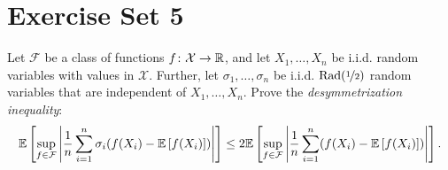 \section{Exercise Set 5}

\begin{exercise}
\end{exercise}


\begin{exercise}
Let $\mathcal{F}$ be a class of functions $f \colon \mathcal{X} \to \mathbb{R}$, and let $X_1, \dots, X_n$ be i.i.d. random variables with values in $\mathcal{X}$. Further, let $\sigma_1, \dots, \sigma_n$ be i.i.d. $\mathrm{Rad}(\nicefrac{1}{2})$ random variables that are independent of $X_1, \dots, X_n$. Prove the \emph{desymmetrization inequality}:
\[
    \mathbb{E}\left[\sup_{f \in \mathcal{F}} \abs{ \frac{1}{n} \sum_{i=1}^n \sigma_i (f(X_i) - \mathbb{E}\left[f(X_i)\right]) }\right] \leq 2 \mathbb{E}\left[\sup_{f \in \mathcal{F}} \abs{ \frac{1}{n} \sum_{i=1}^n (f(X_i) - \mathbb{E}\left[f(X_i)\right]) }\right].
\]
\end{exercise}


\begin{exercise}
\end{exercise}

